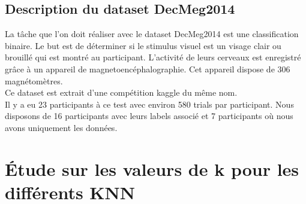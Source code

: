 \documentclass{article}[12pt]
\begin{document}
\subsection{Description du dataset DecMeg2014}
La tâche que l'on doit réaliser avec le dataset DecMeg2014 est une classification binaire. Le but est de déterminer si le stimulus visuel est un visage clair ou brouillé qui est montré au participant. L'activité de leurs cerveaux est enregistré grâce à un appareil de magnetoencéphalographie. Cet appareil dispose de 306 magnétomètres.
\\
Ce dataset est extrait d'une compétition kaggle du même nom.
\\
Il y a eu 23 participants à ce test avec environ 580 trials par participant. Nous disposons de 16 participants avec leurs labels associé et 7 participants où nous avons uniquement les données.


\section{Étude sur les valeurs de k pour les différents KNN}
\end{document}
